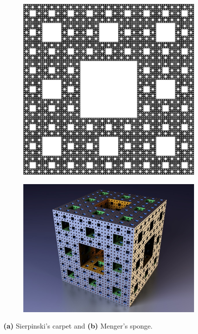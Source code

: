 \documentclass{article}
\begin{document}
	\begin{figure}[H]
		\centering
		\begin{subfigure}[t]{0.37\linewidth}
			\includegraphics[width=\linewidth]{../Data/Sierpinski_carpet.jpg}
			\caption{}
		\end{subfigure}
		\begin{subfigure}[t]{0.5\linewidth}
			\includegraphics[width=\linewidth]{../Data/menger_sponge.jpg}
			\caption{}
		\end{subfigure}
		\caption{\textbf{(a)} Sierpinski's carpet and \textbf{(b)} Menger's sponge.}
		\label{fig:qu21} 
	\end{figure}
\end{document}

